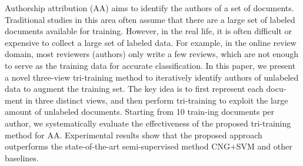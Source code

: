 Authorship attribution (AA) aims to identify the authors of a set of documents. Traditional studies in this area often assume that there are a large set of labeled documents available for training. However, in the real life, it is often difficult or expensive to collect a large set of labeled data. For example, in the online review domain, most reviewers (authors) only write a few reviews, which are not enough to serve as the training data for accurate classification. In this paper, we present a novel three-view tri-training method to iteratively identify authors of unlabeled data to augment the training set. The key idea is to first represent each docu-ment in three distinct views, and then perform tri-training to exploit the large amount of unlabeled documents. Starting from 10 train-ing documents per author, we systematically evaluate the effectiveness of the proposed tri-training method for AA. Experimental results show that the proposed approach outperforms the state-of-the-art semi-supervised method CNG+SVM and other baselines.
